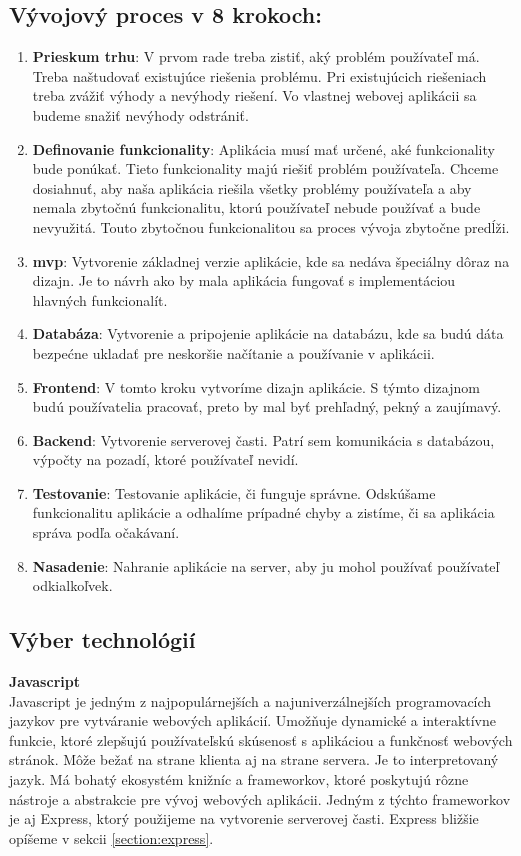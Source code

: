 \subsection{Vývojový proces v 8 krokoch:}
\begin{enumerate}
    \item \textbf{Prieskum trhu}: V prvom rade treba zistiť, aký problém používateľ má. Treba naštudovať existujúce riešenia problému. Pri existujúcich riešeniach treba zvážiť výhody a nevýhody riešení. Vo vlastnej webovej aplikácii sa budeme snažiť nevýhody odstrániť.
    \item \textbf{Definovanie funkcionality}: Aplikácia musí mať určené, aké funkcionality bude ponúkať. Tieto funkcionality majú riešiť problém používateľa. Chceme dosiahnuť, aby naša aplikácia riešila všetky problémy používateľa a aby nemala zbytočnú funkcionalitu, ktorú používateľ nebude používať a bude nevyužitá. Touto zbytočnou funkcionalitou sa proces vývoja zbytočne predĺži. 
    \item  \textbf{\acrshort{mvp}}: Vytvorenie základnej verzie aplikácie, kde sa nedáva špeciálny dôraz na dizajn. Je to návrh ako by mala aplikácia fungovať s implementáciou hlavných funkcionalít.
    \item \textbf{Databáza}: Vytvorenie a pripojenie aplikácie na databázu, kde sa budú dáta bezpećne ukladať pre neskoršie načítanie a používanie v aplikácii.
    \item \textbf{Frontend}: V tomto kroku vytvoríme dizajn aplikácie. S týmto dizajnom budú používatelia pracovať, preto by mal byť prehľadný, pekný a zaujímavý.
    \item \textbf{Backend}: Vytvorenie serverovej časti. Patrí sem komunikácia s databázou, výpočty na pozadí, ktoré používateľ nevidí.
    \item \textbf{Testovanie}: Testovanie aplikácie, či funguje správne. Odskúšame funkcionalitu aplikácie a odhalíme prípadné chyby a zistíme, či sa aplikácia správa podľa očakávaní.
    \item \textbf{Nasadenie}: Nahranie aplikácie na server, aby ju mohol používať používateľ odkialkoľvek.
\end{enumerate}


\subsection{Výber technológií}

\noindent\textbf{Javascript}\cite{javascript}\\
Javascript je jedným z najpopulárnejších a najuniverzálnejších programovacích jazykov pre vytváranie webových aplikácií. Umožňuje dynamické a interaktívne funkcie, ktoré zlepšujú používateľskú skúsenosť s aplikáciou a funkčnosť webových stránok. Môže bežať na strane klienta aj na strane servera. Je to interpretovaný jazyk. Má bohatý ekosystém knižníc a frameworkov, ktoré poskytujú rôzne nástroje a abstrakcie pre vývoj webových aplikácii. Jedným z týchto frameworkov je aj Express, ktorý použijeme na vytvorenie serverovej časti. Express bližšie opíšeme v sekcii \ref{section:express}.

